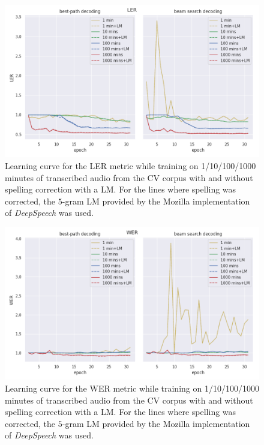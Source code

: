 \begin{figure}[h!]
	\includegraphics[width=\linewidth]{./img/lc_ler_cv.png}
	\caption{Learning curve for the \ac{LER} metric while training on 1/10/100/1000 minutes of transcribed audio from the \ac{CV} corpus with and without spelling correction with a \ac{LM}. For the lines where spelling was corrected, the $5$-gram \ac{LM} provided by the Mozilla implementation of \textit{DeepSpeech} was used.}
	\label{lc_ler_cv}
\end{figure}

\begin{figure}[h!]
	\includegraphics[width=\linewidth]{./img/lc_wer_cv.png}
	\caption{Learning curve for the \ac{WER} metric while training on 1/10/100/1000 minutes of transcribed audio from the \ac{CV} corpus with and without spelling correction with a \ac{LM}. For the lines where spelling was corrected, the $5$-gram \ac{LM} provided by the Mozilla implementation of \textit{DeepSpeech} was used.}
	\label{lc_wer_cv}
\end{figure}

